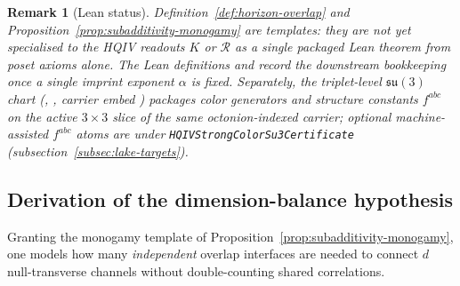 \documentclass[11pt]{amsart}
\newtheorem{remark}[theorem]{Remark}
\begin{document}
\begin{remark}[Lean status]
\label{rem:causal-subadd-lean}
Definition~\ref{def:horizon-overlap} and Proposition~\ref{prop:subadditivity-monogamy} are \emph{templates}: they are not yet specialised to the HQIV readouts \(K\) or \(\mathcal{R}\) as a single packaged Lean theorem from poset axioms alone. The Lean definitions  and  record the downstream \emph{bookkeeping} once a single imprint exponent \(\alpha\) is fixed.
Separately, the triplet-level \(\mathfrak{su}(3)\) chart (, , carrier embed ) packages color generators and structure constants \(f^{abc}\) on the active \(3\times 3\) slice of the same octonion-indexed carrier; optional machine-assisted \(f^{abc}\) atoms are under \texttt{HQIVStrongColorSu3Certificate} (subsection~\ref{subsec:lake-targets}).
\end{remark}

\subsection{Derivation of the dimension-balance hypothesis}

Granting the monogamy template of Proposition~\ref{prop:subadditivity-monogamy}, one models how many \emph{independent} overlap interfaces are needed to connect \(d\) null-transverse channels without double-counting shared correlations.
\end{document}
